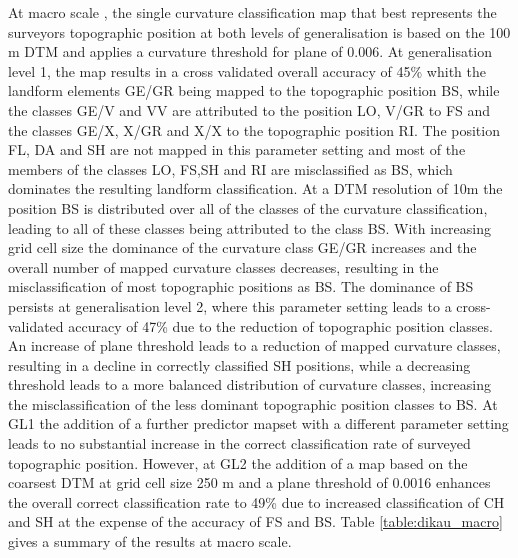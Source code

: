 \documentclass[final,1p,times,twocolumn,authoryear]{elsarticle}
\begin{document}
 At macro scale , the single curvature classification map that best represents the surveyors topographic position at both levels of generalisation is based on the 100 m DTM and applies a curvature threshold for plane of 0.006. At generalisation level 1, the map results in a cross validated overall accuracy of 45\% whith the landform elements GE/GR being mapped to the topographic position BS, while the classes GE/V and VV are attributed to the position LO, V/GR to FS and the classes GE/X, X/GR and X/X to the topographic position RI. The position FL, DA and SH are not mapped in this parameter setting and most of the members of the classes LO, FS,SH and RI are misclassified as BS, which dominates the resulting landform classification. At a DTM resolution of 10m the position BS is distributed over all of the classes of the curvature classification, leading to all of these classes being attributed to the class BS. With increasing grid cell size the dominance of the curvature class GE/GR increases and the overall number of mapped curvature classes decreases, resulting in the misclassification of most topographic positions as BS.  The dominance of BS persists at generalisation level 2, where this parameter setting leads to a cross-validated accuracy of 47\% due to the reduction of topographic position classes. An increase of plane threshold leads to a reduction of mapped curvature classes, resulting in a decline in correctly classified SH positions, while a decreasing threshold leads to a more balanced distribution of curvature classes, increasing the misclassification of the less dominant topographic position classes to BS. At GL1 the addition of a further predictor mapset with a different parameter setting leads to no substantial increase in the correct classification rate of surveyed topographic position. However, at GL2 the addition of a map based on the coarsest DTM at grid cell size  250 m and a plane threshold of 0.0016 enhances the overall correct classification rate to 49\% due to increased classification of CH and SH at the expense of the accuracy of FS and BS. Table \ref{table:dikau_macro} gives a summary of the results at macro scale.
\end{document}
